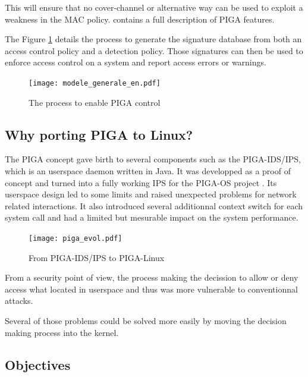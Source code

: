 \documentclass[pdftex,a4paper,titlepage,11pt]{article}
\begin{document}
\bigskip

This will ensure that no cover-channel or alternative way can be used to exploit
a weakness in the MAC policy. \cite{theseJBriffaut} contains a full description
of PIGA features.

\bigskip

The Figure \ref{PIGAARCHI} details the process to generate the signature
database from both an access control policy and a detection policy. Those
signatures can then be used to enforce access control on a system and report
access errors or warnings.

\begin{figure}[h]
	\centering
	\texttt{[image: modele\_generale\_en.pdf]}
	\caption{The process to enable PIGA control}
	\label{PIGAARCHI}
\end{figure}

\subsection{Why porting PIGA to Linux?}

The PIGA concept gave birth to several components such as the PIGA-IDS/IPS,
which is an userspace daemon written in Java. It was developped as a proof of
concept and turned into a fully working IPS for the PIGA-OS project
\cite{pigaosdefisecurite2011}. Its userspace design led to some limits and
raised unexpected problems for network related interactions. It also introduced
several additionnal context switch for each system call and had a limited but
mesurable impact on the system performance.

\begin{figure}[h]
	\centering
	\texttt{[image: piga\_evol.pdf]}
	\caption{From PIGA-IDS/IPS to PIGA-Linux}
	\label{PIGAEVOL}
\end{figure}

\smallskip

From a security point of view, the process making the decission to allow or
deny access what located in userspace and thus was more vulnerable to
conventionnal attacks.

\bigskip

Several of those problems could be solved more easily by moving the decision
making process into the kernel.

\subsection{Objectives}
\end{document}
